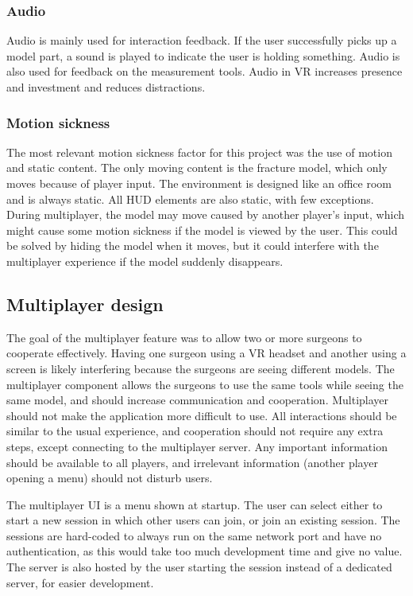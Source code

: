 \documentclass[a4paper]{report}
\begin{document}
\subsubsection{Audio}
Audio is mainly used for interaction feedback. If the user successfully picks up a model part, a sound is played to indicate the user is holding something. Audio is also used for feedback on the measurement tools. Audio in VR increases presence and investment and reduces distractions\cite{audioVR}.

\subsubsection{Motion sickness}
The most relevant motion sickness factor for this project was the use of motion and static content. The only moving content is the fracture model, which only moves because of player input. The environment is designed like an office room and is always static. All HUD elements are also static, with few exceptions.
During multiplayer, the model may move caused by another player's input, which might cause some motion sickness if the model is viewed by the user. This could be solved by hiding the model when it moves, but it could interfere with the multiplayer experience if the model suddenly disappears.

\subsection{Multiplayer design}
The goal of the multiplayer feature was to allow two or more surgeons to cooperate effectively. Having one surgeon using a VR headset and another using a screen is likely interfering because the surgeons are seeing different models. The multiplayer component allows the surgeons to use the same tools while seeing the same model, and should increase communication and cooperation.
Multiplayer should not make the application more difficult to use. All interactions should be similar to the usual experience, and cooperation should not require any extra steps, except connecting to the multiplayer server. Any important information should be available to all players, and irrelevant information (another player opening a menu) should not disturb users.

The multiplayer UI is a menu shown at startup. The user can select either to start a new session in which other users can join, or join an existing session. The sessions are hard-coded to always run on the same network port and have no authentication, as this would take too much development time and give no value. The server is also hosted by the user starting the session instead of a dedicated server, for easier development.
\end{document}
